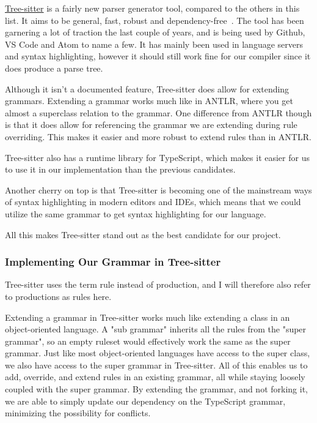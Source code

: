\href{https://tree-sitter.github.io/tree-sitter/}{Tree-sitter} is a fairly new parser generator tool, compared to the others in this list.
It aims to be general, fast, robust and dependency-free~\cite{tree-sitter}.
The tool has been garnering a lot of traction the last couple of years, and is being used by Github, VS Code and Atom to name a few.
It has mainly been used in language servers and syntax highlighting, however it should still work fine for our compiler since it does produce a parse tree.

Although it isn't a documented feature, Tree-sitter does allow for extending grammars.
Extending a grammar works much like in ANTLR, where you get almost a superclass relation to the grammar.
One difference from ANTLR though is that it does allow for referencing the grammar we are extending during rule overriding.
This makes it easier and more robust to extend rules than in ANTLR.

Tree-sitter also has a runtime library for TypeScript, which makes it easier for us to use it in our implementation than the previous candidates.

Another cherry on top is that Tree-sitter is becoming one of the mainstream ways of syntax highlighting in modern editors and IDEs, which means that we could utilize the same grammar to get syntax highlighting for our language.

All this makes Tree-sitter stand out as the best candidate for our project.

\subsubsection{Implementing Our Grammar in Tree-sitter}

Tree-sitter uses the term rule instead of production, and I will therefore also refer to productions as rules here.

Extending a grammar in Tree-sitter works much like extending a class in an object-oriented language.
A "sub grammar" inherits all the rules from the "super grammar", so an empty ruleset would effectively work the same as the super grammar.
Just like most object-oriented languages have access to the super class, we also have access to the super grammar in Tree-sitter.
All of this enables us to add, override, and extend rules in an existing grammar, all while staying loosely coupled with the super grammar.
By extending the grammar, and not forking it, we are able to simply update our dependency on the TypeScript grammar, minimizing the possibility for conflicts.

